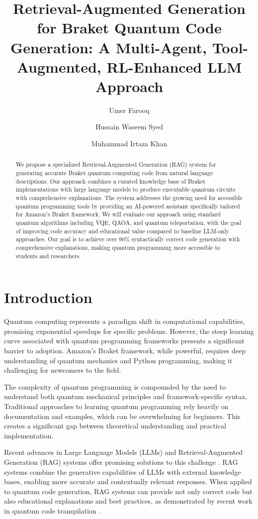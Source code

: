 \documentclass[runningheads]{llncs}
\title{Retrieval-Augmented Generation for Braket Quantum Code Generation: A Multi-Agent, Tool-Augmented, RL-Enhanced LLM Approach}
\author{Umer Farooq \and Hussain Waseem Syed \and Muhammad Irtaza Khan}
\institute{FAST NUCES Islamabad, Department of Computer Science\\
\email{i220891@nu.edu.pk, i220893@nu.edu.pk, i220911@nu.edu.pk}}
\begin{document}
\maketitle

\begin{abstract}
We propose a specialized Retrieval-Augmented Generation (RAG) system for generating accurate Braket quantum computing code from natural language descriptions. Our approach combines a curated knowledge base of Braket implementations with large language models to produce executable quantum circuits with comprehensive explanations. The system addresses the growing need for accessible quantum programming tools by providing an AI-powered assistant specifically tailored for Amazon's Braket framework. We will evaluate our approach using standard quantum algorithms including VQE, QAOA, and quantum teleportation, with the goal of improving code accuracy and educational value compared to baseline LLM-only approaches. Our goal is to achieve over 90\% syntactically correct code generation with comprehensive explanations, making quantum programming more accessible to students and researchers.
\end{abstract}

\section{Introduction}

Quantum computing represents a paradigm shift in computational capabilities, promising exponential speedups for specific problems. However, the steep learning curve associated with quantum programming frameworks presents a significant barrier to adoption. Amazon's Braket framework, while powerful, requires deep understanding of quantum mechanics and Python programming, making it challenging for newcomers to the field.

The complexity of quantum programming is compounded by the need to understand both quantum mechanical principles and framework-specific syntax. Traditional approaches to learning quantum programming rely heavily on documentation and examples, which can be overwhelming for beginners. This creates a significant gap between theoretical understanding and practical implementation.

Recent advances in Large Language Models (LLMs) and Retrieval-Augmented Generation (RAG) systems offer promising solutions to this challenge \cite{siavash2025modeldrivenquantumcodegeneration}. RAG systems combine the generative capabilities of LLMs with external knowledge bases, enabling more accurate and contextually relevant responses. When applied to quantum code generation, RAG systems can provide not only correct code but also educational explanations and best practices, as demonstrated by recent work in quantum code transpilation \cite{siavash2025llmpoweredquantumcodetranspilation}.
\end{document}
